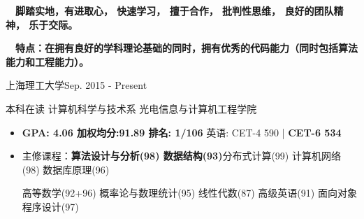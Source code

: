 \documentclass{sorahjy_cv}
\begin{document}
\pagestyle{empty}


\begin{cvHeader}
\end{cvHeader}


%
%

\begin{description}{}
	\item{\ \ }\textbf{脚踏实地，有进取心， 快速学习， 擅于合作， 批判性思维， 良好的团队精神， 乐于交际。}
	\item{\ \ }\textbf{特点：在拥有良好的学科理论基础的同时，拥有优秀的代码能力（同时包括算法能力和工程能力）。}
\end{description}


%
%

\begin{sectionContentSimple}{上海理工大学}{Sep. 2015 - Present}
	\item 本科在读 \quad 计算机科学与技术系 \quad 光电信息与计算机工程学院
	\begin{itemize}
		\item \textbf{GPA: 4.06 \quad 加权均分:91.89 \quad 排名: 1/106} \quad \quad  英语: CET-4 590 | \textbf{CET-6 534}
		\item 主修课程：\textbf{算法设计与分析(98) 数据结构(93)}分布式计算(99) 计算机网络(98) 数据库原理(96)

		高等数学(92+96) 概率论与数理统计(95) 线性代数(87) 高级英语(91) 面向对象程序设计(97)
	\end{itemize}
\end{sectionContentSimple}

%
%



\end{document}
